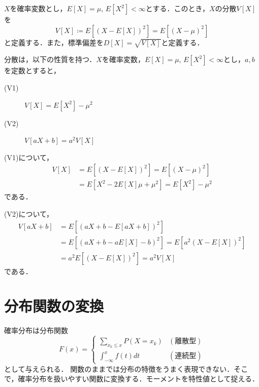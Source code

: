 \documentclass{jsreport}
\begin{document}
\begin{screen}
  \begin{defi}[分散]
    $X$を確率変数とし，$E[X] = \mu, \, E[X^2] < \infty$とする．このとき，$X$の分散$V[X]$を
    \begin{equation}
      V[X] \coloneqq E[(X - E[X])^2] = E[(X - \mu)^2] \nonumber
    \end{equation}
    と定義する．また，標準偏差を$D[X] = \sqrt{V[X]}$と定義する．
  \end{defi}
\end{screen}

分散は，以下の性質を持つ．$X$を確率変数，$E[X] = \mu, \, E[X^2] < \infty$とし，$a, b$を定数とすると，
\begin{description}
  \item[(V1)] $V[X] = E[X^2] - \mu^2$
  \item[(V2)] $V[aX + b] = a^2V[X]$
\end{description}

(V1)について，
\begin{align}
  V[X] &= E[(X-E[X])^2] = E[(X - \mu)^2] \nonumber \\
  &= E[X^2 - 2E[X]\mu + \mu^2] = E[X^2] - \mu^2 \nonumber
\end{align}
である．

(V2)について，
\begin{align}
  V[aX + b] &= E[(aX + b - E[aX + b])^2] \nonumber \\
  &= E[(aX + b - aE[X] -b)^2] = E[a^2(X - E[X])^2] \nonumber \\
  &= a^2 E[(X - E[X])^2] = a^2 V[X] \nonumber
\end{align}
である．

\section{分布関数の変換}
確率分布は分布関数
\begin{equation}
  F(x) = \begin{cases}
    \sum_{x_k \leq x} P(X = x_k) & (離散型) \\
    \int_{-\infty}^x f(t)dt & (連続型)
\end{cases}\nonumber
\end{equation}
として与えられる．
関数のままでは分布の特徴をうまく表現できない．そこで，確率分布を扱いやすい関数に変換する．モーメントを特性値として捉える．
\end{document}

